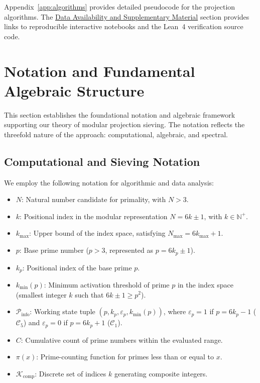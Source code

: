 \documentclass{article}
\numberwithin{equation}{section}
\theoremstyle{plain}
\theoremstyle{definition}
\begin{document}
Appendix~\ref{app:algorithms} provides detailed pseudocode for the projection algorithms. The \hyperref[sec:disponibilidad]{Data Availability and Supplementary Material} section provides links to reproducible interactive notebooks and the Lean~4 verification source code.

\section{Notation and Fundamental Algebraic Structure}
\label{sec:notacion-estructura}

This section establishes the foundational notation and algebraic framework supporting our theory of modular projection sieving. The notation reflects the threefold nature of the approach: computational, algebraic, and spectral.

\subsection{Computational and Sieving Notation}

We employ the following notation for algorithmic and data analysis:
\begin{itemize}
    \item $N$: Natural number candidate for primality, with $N > 3$.
    \item $k$: Positional index in the modular representation $N = 6k \pm 1$, with $k \in \mathbb{N}^+$.
    \item $k_{\max}$: Upper bound of the index space, satisfying $N_{\max} = 6k_{\max} + 1$.
    \item $p$: Base prime number ($p > 3$, represented as $p = 6k_p \pm 1$).
    \item $k_p$: Positional index of the base prime $p$.
    \item $k_{\min}(p)$: Minimum activation threshold of prime $p$ in the index space (smallest integer $k$ such that $6k \pm 1 \ge p^2$).
    \item $\mathcal{P}_{\text{info}}$: Working state tuple $(p, k_p, \varepsilon_p, k_{\min}(p))$, where $\varepsilon_p = 1$ if $p = 6k_p - 1$ ($\mathcal{C}_5$) and $\varepsilon_p = 0$ if $p = 6k_p + 1$ ($\mathcal{C}_1$).
    \item $C$: Cumulative count of prime numbers within the evaluated range.
    \item $\pi(x)$: Prime-counting function for primes less than or equal to $x$.
    \item $\mathcal{K}_{\text{comp}}$: Discrete set of indices $k$ generating composite integers.
\end{itemize}
\end{document}
